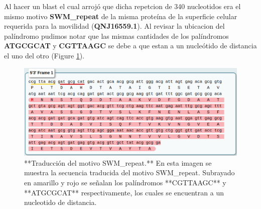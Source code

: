 \documentclass[
]{book}
\begin{document}
Al hacer un blast el cual arrojó que dicha repetcion de 340 nucleotidos era el mismo motivo \textbf{SWM\_repeat} de la misma proteína de la superficie celular requerida para la movilidad (\textbf{QNJ16559.1}). Al revisar la ubicacion del palíndromo pudimos notar que las mismas cantidades de los palíndromos \textbf{ATGCGCAT} y \textbf{CGTTAAGC} se debe a que estan a un nucleótido de distancia el uno del otro (Figure \ref{fig:FIG11}).

\begin{figure}

{\centering \includegraphics[width=17.4in]{Clados/Clado_A18-40/SWM_3} 

}

\caption{**Traducción del motivo SWM\_repeat.** En esta imagen se muestra la secuencia traducida del motivo SWM\_repeat. Subrayado en amarillo y rojo se señalan los palíndromos **CGTTAAGC** y **ATGCGCAT** respectivamente, los cuales se encuentran a un nucleotido de distancia.}\label{fig:FIG11}
\end{figure}

  
\end{document}
